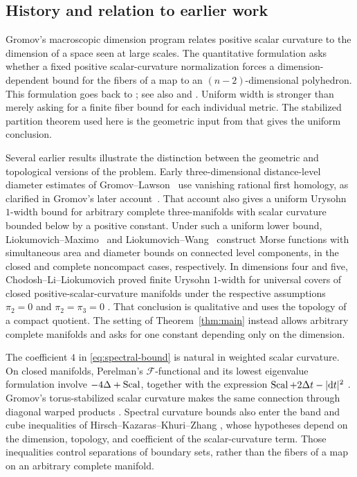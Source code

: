 \subsection{History and relation to earlier work}

Gromov's macroscopic dimension program relates positive scalar curvature
to the dimension of a space seen at large scales. The quantitative
formulation asks whether a fixed positive scalar-curvature normalization
forces a dimension-dependent bound for the fibers of a map to an
$(n-2)$-dimensional polyhedron. This formulation goes back to
\cite[\S\,2.A(c)]{Gromov1986}; see also
\cite[\S\,$2\frac12$]{Gromov1996} and
\cite{Gromov2023}. Uniform width is stronger than merely
asking for a finite fiber bound for each individual metric. The
stabilized partition theorem used here is the geometric input from
\cite{OpenAIWidth} that gives the uniform conclusion.

Several earlier results illustrate the distinction between the
geometric and topological versions of the problem. Early
three-dimensional distance-level diameter estimates of
Gromov--Lawson~\cite{GromovLawson1983} use vanishing rational first
homology, as clarified in Gromov's later account~\cite{Gromov2023}.
That account also gives a uniform Urysohn $1$-width bound for arbitrary
complete three-manifolds with scalar curvature bounded below by a
positive constant. Under such a uniform lower bound,
Liokumovich--Maximo~\cite{LiokumovichMaximo2023} and
Liokumovich--Wang~\cite{LiokumovichWang2026} construct Morse functions
with simultaneous area and diameter bounds on connected level
components, in the closed and complete noncompact cases, respectively.
In dimensions four and five,
Chodosh--Li--Liokumovich proved finite Urysohn $1$-width for universal
covers of closed positive-scalar-curvature manifolds under the
respective assumptions $\pi_2=0$ and $\pi_2=\pi_3=0$
\cite[Theorem~4]{ChodoshLiLiokumovich2023}. That conclusion is
qualitative and uses the topology of a compact quotient. The setting
of Theorem~\ref{thm:main} instead allows arbitrary complete manifolds
and asks for one constant depending only on the dimension.

The coefficient $4$ in \eqref{eq:spectral-bound} is natural in weighted
scalar curvature. On closed manifolds, Perelman's $\mathcal F$-functional and its lowest
eigenvalue formulation involve $-4\Delta+\operatorname{Scal}$, together with the
expression $\operatorname{Scal}+2\Delta t-|\mathrm d t|^2$
\cite[\S\S1--2]{Perelman2002}. Gromov's torus-stabilized scalar
curvature makes the same connection through diagonal warped products
\cite[\S\S1.A--1.B]{Gromov2024}. Spectral curvature bounds also enter
the band and cube inequalities of Hirsch--Kazaras--Khuri--Zhang
\cite{HirschKazarasKhuriZhang2024}, whose hypotheses depend on the
dimension, topology, and coefficient of the scalar-curvature term.
Those inequalities control separations of boundary sets, rather than
the fibers of a map on an arbitrary complete manifold.

